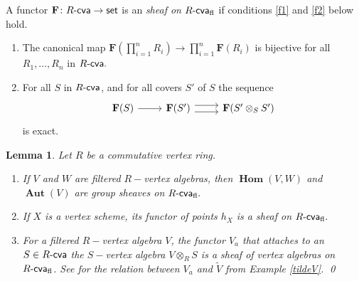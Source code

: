 \documentclass{article}
\newtheorem{lem}[thm]{Lemma}
\theoremstyle{definition}
\newtheorem{rem}[thm]{Remark}
\def\BAut{\ensuremath{\operatorname{\mathbf{Aut}}}}
\def\BHom{\ensuremath{\operatorname{\mathbf{Hom}}}}
\def\Rcva{\ensuremath{R\text{-\textup{\textsf{cva}}}}}
\def\set{\ensuremath{\text{\textup{\textsf{set}}}}}
\def\BF{\ensuremath{\mathbf{F}}}
\begin{document}
A functor $\BF \colon \Rcva \to \set$ is an {\it  sheaf on} $\Rcva_{\rm fl}$ if   conditions \ref{f1} and \ref{f2} below hold.
\begin{enumerate}[label = {\textup{(F\arabic*)}}]
\item \label{f1} The canonical map $\BF(\prod_{i = 1}^n R_i) \to \prod_{i = 1}^{n} \BF(R_i)$ is bijective for all $R_1, \dots , R_n$ in $\Rcva.$
\item \label{f2} For all $S$ in $\Rcva$, and for all covers $S'$ of $S$  the sequence \[\begin{tikzcd}
 \BF(S) \ar[r] & \BF(S') \ar[r,shift left=.75ex]
  \ar[r,shift right=.75ex,swap] & \BF(S'\otimes_S S')
  \end{tikzcd}\]
 is exact.
 \end{enumerate}



\begin{lem}\label{Autsheaf} Let $R$ be a commutative vertex ring. 
	\begin{enumerate}[label = \textup{\alph*)}]
\item If $V$ and $W$ are filtered $R-$vertex algebras, then $\BHom(V,W)$ and $\BAut(V)$ are group sheaves on $\Rcva_{\rm fl}.$

\item If $X$ is a vertex scheme, its functor of points $h_X$ is a sheaf on $\Rcva_{\rm fl}.$
\item For a filtered $R-$vertex algebra $V$, the functor $V_a$ that attaches to an $S \in \Rcva$ the $S-$vertex algebra $V \otimes_R S$ is a sheaf of vertex algebras on $\Rcva_{\rm fl}$. See \cite[\@I Prop.\ 4.6.2]{SGA3} for the relation between $V_a$ and $\widetilde V$ from Example \ref{tildeV}.
	\qed
\end{enumerate}
\end{lem} 
\end{document}
